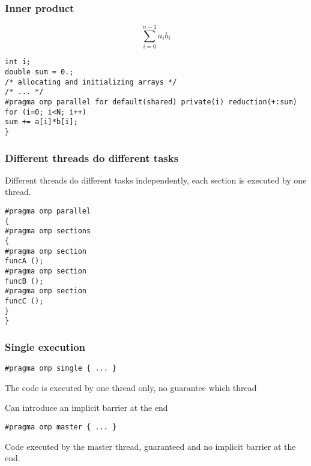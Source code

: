 \documentclass{beamer}
\begin{document}
\begin{frame}
\frametitle{Inner product}

\begin{block}{}
\[
\sum_{i=0}^{n-1} a_ib_i
\]
\begin{verbatim}
int i;
double sum = 0.;
/* allocating and initializing arrays */
/* ... */
#pragma omp parallel for default(shared) private(i) reduction(+:sum)
for (i=0; i<N; i++)
sum += a[i]*b[i];
}
\end{verbatim}


\end{block}
\end{frame}

\begin{frame}
\frametitle{Different threads do different tasks}

\begin{block}{}

Different threads do different tasks independently, each section is executed by one thread.
\begin{verbatim}
#pragma omp parallel
{
#pragma omp sections
{
#pragma omp section
funcA ();
#pragma omp section
funcB ();
#pragma omp section
funcC ();
}
}
\end{verbatim}

\end{block}
\end{frame}

\begin{frame}
\frametitle{Single execution}

\begin{block}{}
\begin{verbatim}
#pragma omp single { ... }
\end{verbatim}
The code is executed by one thread only, no guarantee which thread

Can introduce an implicit barrier at the end
\begin{verbatim}
#pragma omp master { ... }
\end{verbatim}
Code executed by the master thread, guaranteed and no implicit barrier at the end.
\end{block}
\end{frame}
\end{document}
